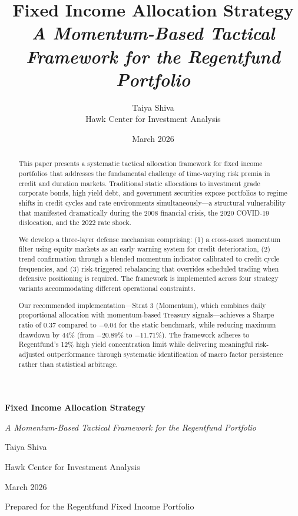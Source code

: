 \documentclass[11pt]{article}
\title{%
    \vspace{-1cm}
    \textbf{Fixed Income Allocation Strategy}\\[0.5cm]
    \large\textit{A Momentum-Based Tactical Framework for the Regentfund Portfolio}
}
\author{%
    Taiya Shiva\\
    \small Hawk Center for Investment Analysis
}
\date{March 2026}
\begin{document}
\begin{titlepage}
    \centering
    \vspace*{3cm}

    {\Huge\bfseries Fixed Income Allocation Strategy\par}
    \vspace{1cm}
    {\Large\itshape A Momentum-Based Tactical Framework for the Regentfund Portfolio\par}

    \vspace{2cm}

    {\large Taiya Shiva\par}
    \vspace{0.5cm}
    {\normalsize Hawk Center for Investment Analysis\par}

    \vspace{2cm}

    {\large March 2026\par}

    \vfill

    {\small Prepared for the Regentfund Fixed Income Portfolio\par}
\end{titlepage}

\begin{abstract}
\noindent
This paper presents a systematic tactical allocation framework for fixed income portfolios that addresses the fundamental challenge of time-varying risk premia in credit and duration markets. Traditional static allocations to investment grade corporate bonds, high yield debt, and government securities expose portfolios to regime shifts in credit cycles and rate environments simultaneously---a structural vulnerability that manifested dramatically during the 2008 financial crisis, the 2020 COVID-19 dislocation, and the 2022 rate shock.

We develop a three-layer defense mechanism comprising: (1) a cross-asset momentum filter using equity markets as an early warning system for credit deterioration, (2) trend confirmation through a blended momentum indicator calibrated to credit cycle frequencies, and (3) risk-triggered rebalancing that overrides scheduled trading when defensive positioning is required. The framework is implemented across four strategy variants accommodating different operational constraints.

Our recommended implementation---Strat 3 (Momentum), which combines daily proportional allocation with momentum-based Treasury signals---achieves a Sharpe ratio of 0.37 compared to $-0.04$ for the static benchmark, while reducing maximum drawdown by 44\% (from $-20.89\%$ to $-11.71\%$). The framework adheres to Regentfund's 12\% high yield concentration limit while delivering meaningful risk-adjusted outperformance through systematic identification of macro factor persistence rather than statistical arbitrage.
\end{abstract}
\end{document}
